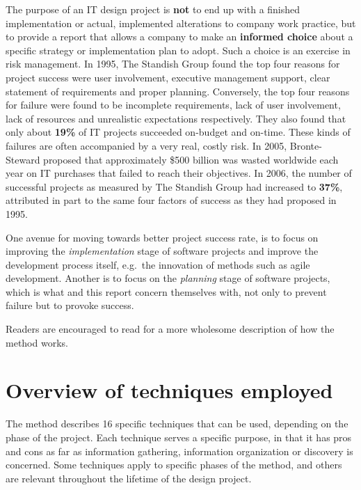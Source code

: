 The purpose of an IT design project is \textbf{not} to end up with a
finished implementation or actual, implemented alterations to company work
practice, but to provide a report that allows a company to make an
\textbf{informed choice} about a specific strategy or implementation plan to
adopt. Such a choice is an exercise in risk management. In 1995, The Standish
Group found the top four reasons for project success were user involvement,
executive management support, clear statement of requirements and proper
planning\cite{standish1995chaos}. Conversely, the top four reasons for failure
were found to be incomplete requirements, lack of user involvement, lack of
resources and unrealistic expectations respectively\cite{standish1995chaos}.
They also found that only about \textbf{19\%} of IT projects succeeded on-budget
and on-time\cite{standish1995chaos}. These kinds of failures are often
accompanied by a very real, costly risk.  In 2005, Bronte-Steward proposed that
approximately \$500 billion was wasted worldwide each year on IT purchases that
failed to reach their objectives\cite{bronte2005developing}. In 2006, the number
of successful projects as measured by The Standish Group\cite{standish2012} had
increased to \textbf{37\%}, attributed in part to the same four factors of
success as they had proposed in 1995. 

One avenue for moving towards better project success rate, is to focus on
improving the \textit{implementation} stage of software projects and improve the
development process itself, e.g.\ the innovation of methods such as agile
development. Another is to focus on the \textit{planning} stage of software
projects, which is what \must{} and this report concern themselves with, not
only to prevent failure but to provoke success.

Readers are encouraged to read \cite{bodker2004participatory} for a more
wholesome description of how the \must{} method works.

\section{Overview of techniques employed} \label{sec:overview}
The \must{} method describes 16 specific techniques that can be used, depending
on the phase of the project. Each technique serves a specific purpose, in that it
has pros and cons as far as information gathering, information organization or discovery
is concerned. Some techniques apply to specific phases of the \must{} method, and others
are relevant throughout the lifetime of the design project.

